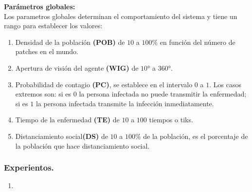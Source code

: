 \documentclass[12pt]{article}
\begin{document}
\textbf{Parámetros globales:}\\

Los parametros globales determinan el comportamiento del sistema y tiene un rango para establecer los valores:\\

\begin{enumerate}
    \item Densidad de la población \textbf{(POB)} de $10$ a $100\%$ en función del número de patches en el mundo.
    \item Apertura de visión del agente \textbf{(WIG)} de $10$° a $360$°.
    \item Probabilidad de contagio \textbf{(PC)}, se establece en el intervalo $0$ a $1$. Los casos extremos son: si es $0$ la persona infectada no puede transmitir la enfermedad; si es $1$ la persona infectada
    transmite la infección inmediatamente.
    \item Tiempo de la enfermedad \textbf{(TE)} de $10$ a $100$ tiempos o tiks.
    \item Distanciamiento social\textbf{(DS)} de $10$ a $100\%$ de la población, es el porcentaje de la población que hace distanciamiento social.
\end{enumerate}

{\color{blue} \subsubsection*{Experientos.}}
\vspace{1em}

\begin{enumerate}
    \item 
\end{enumerate}
\end{document}
